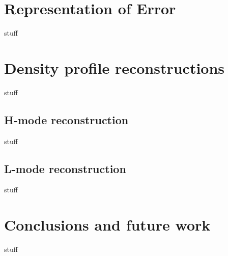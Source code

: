 \documentclass	[12pt]{article}
\begin{document}
\section{Representation of Error}
stuff
\section{Density profile reconstructions}
stuff
\subsection{H-mode reconstruction}
stuff
\subsection{L-mode reconstruction}
stuff
\section{Conclusions and future work}
stuff



\end{document}
